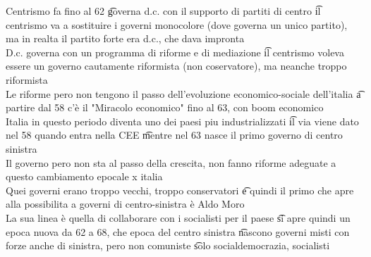 \documentclass[12pt]{article}
\begin{document}
Centrismo fa fino al 62 \t governa d.c. con il supporto di partiti di centro \t il centrismo va a sostituire i governi monocolore (dove governa un unico partito), ma in realta il partito forte era d.c., che dava impronta \\
D.c. governa con un programma di riforme e di mediazione \t il centrismo voleva essere un governo cautamente riformista (non coservatore), ma neanche troppo riformista \\
Le riforme pero non tengono il passo dell'evoluzione economico-sociale dell'italia \t a partire dal 58 c'è il "Miracolo economico" fino al 63, con boom economico \\
Italia in questo periodo diventa uno dei paesi piu industrializzati \t il via viene dato nel 58 quando entra nella CEE \t mentre nel 63 nasce il primo governo di centro sinistra \\
Il governo pero non sta al passo della crescita, non fanno riforme adeguate a questo cambiamento epocale x italia \\
Quei governi erano troppo vecchi, troppo conservatori \t e quindi il primo che apre alla possibilita a governi di centro-sinistra è Aldo Moro \\
La sua linea è quella di collaborare con i socialisti per il paese \t si apre quindi un epoca nuova da 62 a 68, che epoca del centro sinistra \t nascono governi misti con forze anche di sinistra, pero non comuniste \t solo socialdemocrazia, socialisti
\end{document}
